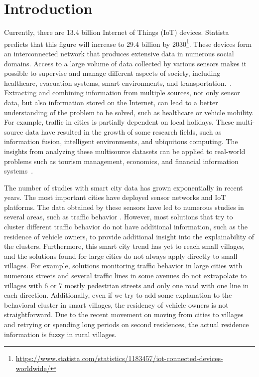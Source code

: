 \chapter{Introduction}

Currently, there are 13.4 billion Internet of Things (IoT) devices. Statista predicts that this figure will increase to 29.4 billion by 2030\footnote{\url{https://www.statista.com/statistics/1183457/iot-connected-devices-worldwide/}}. These devices form an interconnected network that produces extensive data in numerous social domains. Access to a large volume of data collected by various sensors makes it possible to supervise and manage different aspects of society, including healthcare, evacuation systems, smart environments, and transportation.~\cite{atzori2010internet,bermudez2018analysing,garcia2022machine, centelles2019lora}. Extracting and combining information from multiple sources, not only sensor data, but also information stored on the Internet, can lead to a better understanding of the problem to be solved, such as healthcare or vehicle mobility. For example, traffic in cities is partially dependent on local holidays. These multi-source data have resulted in the growth of some research fields, such as information fusion, intelligent environments, and ubiquitous computing. The insights from analyzing these multisource datasets can be applied to real-world problems such as tourism management, economics, and financial information systems~\cite{haughton2004sustainable}.

The number of studies with smart city data has grown exponentially in recent years. The most important cities have deployed sensor networks and IoT platforms. The data obtained by these sensors have led to numerous studies in several areas, such as traffic behavior \cite{mondal2019identifying,lin2019application,peixoto2021traffic,ning2019vehicular}. However, most solutions that try to cluster different traffic behavior do not have additional information, such as the residence of vehicle owners, to provide additional insight into the explainability of the clusters. Furthermore, this smart city trend has yet to reach small villages, and the solutions found for large cities do not always apply directly to small villages. For example, solutions monitoring traffic behavior in large cities with numerous streets and several traffic lines in some avenues do not extrapolate to villages with 6 or 7 mostly pedestrian streets and only one road with one line in each direction. Additionally, even if we try to add some explanation to the behavioral cluster in smart villages, the residency of vehicle owners is not straightforward. Due to the recent movement on moving from cities to villages and retrying or spending long periods on second residences, the actual residence information is fuzzy in rural villages.

